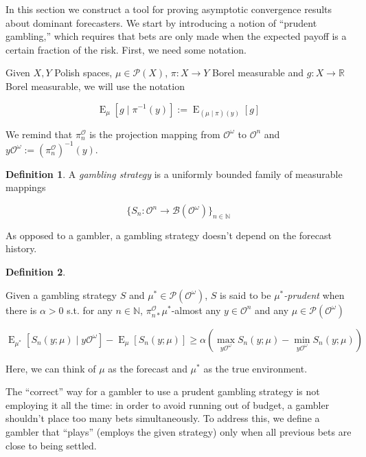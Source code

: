 \documentclass[11pt]{article}
\theoremstyle{definition}
\newtheorem{definition}{Definition}%
\theoremstyle{plain}
\newcommand{\Nats}{\mathbb{N}}
\newcommand{\Reals}{\mathbb{R}}
\newcommand{\Sq}[2]{\{#1\}_{#2 \in \Nats}}
\newcommand{\Sqn}[1]{\Sq{#1}{n}}
\DeclareMathOperator{\E}{E}
\newcommand{\PM}{\mathcal{P}}
\newcommand{\Ob}{\mathcal{O}}
\newcommand{\OO}{\Ob^\omega}
\newcommand{\PO}{\pi^\Ob}
\newcommand{\PMO}{\PM(\OO)}
\newcommand{\Gm}{\mathcal{B}}
\newcommand{\GMO}{\Gm(\OO)}
\begin{document}
In this section we construct a tool for proving asymptotic convergence results about dominant forecasters. We start by introducing a notion of \enquote{prudent gambling,} which requires that bets are only made when the expected payoff is a certain fraction of the risk. First, we need some notation.

Given $X,Y$ Polish spaces, $\mu \in \PM(X)$, $\pi: X \rightarrow Y$ Borel measurable and $g: X \rightarrow \Reals$ Borel measurable, we will use the notation 

\begin{equation}
\E_{\mu}\left[g \mid \pi^{-1}\left(y\right)\right]:=\E_{\left(\mu \mid \pi\right)\left(y\right)}\left[g\right]
\end{equation}

We remind that $\PO_n$ is the projection mapping from $\OO$ to $\Ob^n$ and $y\OO:= \left(\PO_{n}\right)^{-1}\left(y\right)$.

\begin{definition}

A \emph{gambling strategy} is a uniformly bounded family of measurable mappings

\[\Sqn{S_n: \Ob^n \rightarrow \GMO}\]

\end{definition}

As opposed to a gambler, a gambling strategy doesn't depend on the forecast history.

\begin{definition}
\label{def:prudent}

Given a gambling strategy $S$ and $\mu^* \in \PMO$, $S$ is said to be \emph{$\mu^*$-prudent} when there is $\alpha > 0$ s.t. for any $n \in \Nats$, $\PO_{n*} \mu^*$-almost any $y \in \Ob^n$ and any $\mu \in \PMO$

\begin{equation}
\E_{\mu^*}\left[S_n\left(y; \mu\right) \mid y\OO\right] - \E_\mu\left[S_n\left(y; \mu\right)\right] \geq \alpha \left(\max_{y\OO}{S_n\left(y; \mu\right)} - \min_{y\OO}{S_n\left(y; \mu\right)}\right)
\end{equation}

\end{definition}

Here, we can think of $\mu$ as the forecast and $\mu^*$ as the true environment. 

The \enquote{correct} way for a gambler to use a prudent gambling strategy is not employing it all the time: in order to avoid running out of budget, a gambler shouldn’t place too many bets simultaneously. To address this, we define a gambler that \enquote{plays} (employs the given strategy) only when all previous bets are close to being settled.
\end{document}

